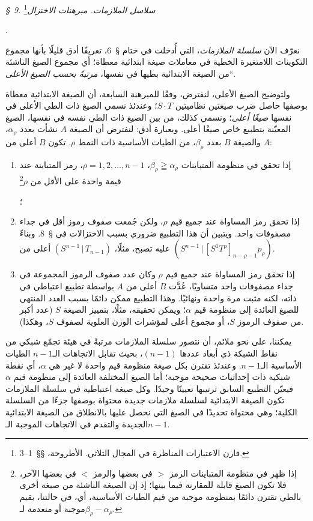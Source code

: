 \documentclass[11pt]{article}
\providecommand{\glqq}{\textquotedblbase}
\providecommand{\grqq}{\textquotedblleft}
\newcommand{\srcLTR}[1]{\relax\ifmmode\text{\mbox{\babelsublr{\foreignlanguage{english}{#1}}}}\else\babelsublr{\foreignlanguage{english}{#1}}\fi}
\newcommand{\srcfn}[2]{\begingroup\renewcommand{\thefootnote}{\srcLTR{#1}}\footnote{#2}\addtocounter{footnote}{-1}\endgroup}
\providecommand{\pair}[2]{(#1\,|\,#2)}
\begin{document}
\begin{center}
\emph{\S\ 9. سلاسل الملازمات. مبرهنات الاختزال}\srcfn{*)}{قارن الاعتبارات المناظرة في المجال الثلاثي. الأطروحة، \S\S\ 1--3.}.
\end{center}
نعرّف الآن \emph{سلسلة الملازمات}، التي أُدخلت في ختام \S\ 6، تعريفًا أدق قليلًا بأنها \glqq{}مجموع التكوينات اللامتغيرة الخطية في معاملات صيغة ابتدائية معطاة؛ أي مجموع الصيغ الناشئة من الصيغة الابتدائية بطيها في نفسها، \emph{مرتبةً بحسب الصيغ الأعلى}\grqq{}.

ولتوضيح الصيغ الأعلى، لنفترض، وفقًا للمبرهنة السابعة، أن الصيغة الابتدائية معطاة بوصفها حاصل ضرب صيغتين نظاميتين $S\cdot T$؛ وعندئذ نسمي الصيغ ذات الطي الأعلى في نفسها \emph{صيغًا أعلى}؛ ونسمي كذلك، من بين الصيغ ذات الطي نفسه في نفسها، الصيغ المعيّنة بتطبيع خاص صيغًا أعلى. وبعبارة أدق: لنفترض أن الصيغة $A$ نشأت بعدد $\alpha_\rho$، والصيغة $B$ بعدد $\beta_\rho$، من الطيات الأساسية ذات النمط $\rho$. تكون $B$ أعلى من $A$:
\begin{enumerate}
\renewcommand{\labelenumi}{\arabic{enumi})}
\item إذا تحقق في منظومة المتباينات $\beta_\rho\geqq\alpha_\rho$، $\rho=1,2,\ldots,n-1$، رمز المتباينة عند قيمة واحدة على الأقل من $\rho$\srcfn{**)}{إذا ظهر في منظومة المتباينات الرمز $>$ في بعضها والرمز $<$ في بعضها الآخر، فلا تكون الصيغ قابلة للمقارنة فيما بينها؛ إذ إن الصيغة الناشئة من صيغة أخرى بالطي تقترن دائمًا بمنظومة موجبة من قيم الطيات الأساسية، أي، في حالتنا، بقيم موجبة أو منعدمة لـ$\beta_\rho-\alpha_\rho$.}؛
\item إذا تحقق رمز المساواة عند جميع قيم $\rho$، ولكن جُمعت صفوف رموز أقل في جداء مصفوفات واحد. ويتبين أن هذا التطبيع ضروري بسبب الاختزالات في \S\ 8. وبناءً عليه تصبح، مثلًا، $\pair{S^{n-1}}{T_{n-1}}$ أعلى من $\pair{S^{n-1}}{[S^1T^\rho]_{n-\rho-1}p_\rho}$.
\item إذا تحقق رمز المساواة عند جميع قيم $\rho$ وكان عدد صفوف الرموز المجموعة في جداء مصفوفات واحد متساويًا، عُدَّت $B$ أعلى من $A$ بواسطة تطبيع اعتباطي في ذاته، لكنه مثبت مرة واحدة ونهائيًا. وهذا التطبيع ممكن دائمًا بسبب العدد المنتهي للصيغ العائدة إلى منظومة قيم $\alpha$؛ ويمكن تحقيقه، مثلًا، بتمييز الصيغة $S$ (عدد أكبر من صفوف الرموز $S$، أو مجموع أعلى لمؤشرات الوزن العلوية لصفوف $S$، وهكذا).
\end{enumerate}
يمكننا، على نحو ملائم، أن نتصور سلسلة الملازمات مرتبةً في هيئة تجمّع شبكي من نقاط الشبكة ذي أبعاد عددها $(n-1)$، بحيث تقابل الاتجاهات الـ$n-1$ الطيات الأساسية الـ$n-1$. وعندئذ تقترن بكل صيغة منظومة قيم واحدة لا غير هي $\alpha$، أي نقطة شبكية ذات إحداثيات صحيحة موجبة؛ أما الصيغ المختلفة العائدة إلى منظومة قيم $\alpha$ فيعيّن التطبيع السابق ترتيبها تعيينًا وحيدًا. وكل صيغة اعتباطية في سلسلة الملازمات تكون الصيغة الابتدائية لسلسلة ملازمات جديدة محتواة بوصفها جزءًا من السلسلة الكلية؛ وهي محتواة تحديدًا في الصيغ التي نحصل عليها بالانطلاق من الصيغة الابتدائية الجديدة والتقدم في الاتجاهات الموجبة الـ$n-1$.
\end{document}
